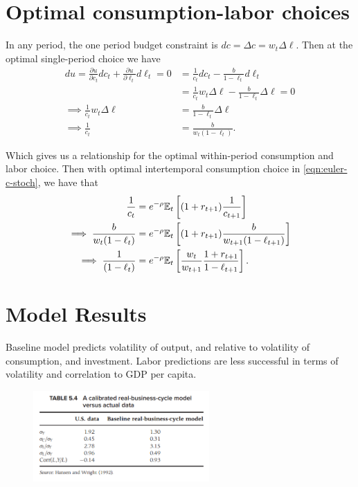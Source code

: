 \documentclass[../main.tex]{subfiles}
\begin{document}
    \section{Optimal consumption-labor choices}
        
        In any period, the one period budget constraint is $dc = \Delta c = w_t \Delta \ell$. Then at the optimal single-period choice we have
        \begin{align}
            d u
            = \frac{\partial u}{\partial c_t} d c_t + \frac{\partial u}{\partial \ell_t} d \ell_t
            = 0
            &= \frac{1}{c_t} dc_t
            - \frac{b}{1 - \ell_t} d\ell_t
            \\
            &= \frac{1}{c_t} w_t \Delta \ell
            - \frac{b}{1 - \ell_t} \Delta \ell
            = 0
            \\
            \implies
            \frac{1}{c_t} w_t \Delta \ell
            &= \frac{b}{1 - \ell_t} \Delta \ell
            \\
            \implies
            \frac{1}{c_t}
            &= \frac{b}{w_t(1 - \ell_t)}.
        \end{align}
        
        Which gives us a relationship for the optimal within-period consumption and labor choice. Then with optimal intertemporal consumption choice in \eqref{eqn:euler-c-stoch}, we have that
        \begin{align}
            \frac{1}{c_t}
            &= e^{-\rho} \mathbb{E}_t\left[(1+r_{t+1})\frac{1}{c_{t+1}}\right]
            \\ \implies
            \frac{b}{w_t(1 - \ell_t)}
            &= e^{-\rho} \mathbb{E}_t\left[(1+r_{t+1})\frac{b}{w_{t+1} (1-\ell_{t+1})}\right]
            \\ \implies
            \frac{1}{(1 - \ell_t)}
            &= e^{-\rho} \mathbb{E}_t\left[\frac{ w_t}{w_{t+1}}\frac{1+r_{t+1}}{1-\ell_{t+1}}\right].
        \end{align}
    
    
    \section{Model Results}
        
        Baseline model predicts volatility of output, and relative to volatility of consumption, and investment. Labor predictions are less successful in terms of volatility and correlation to GDP per capita.
        
        \begin{figure}[ht!]
            \centering \includegraphics[width=0.6\textwidth]{subfile/attachments/5.3-RBC Empricial Results.png}
        \end{figure}
        
\end{document}
